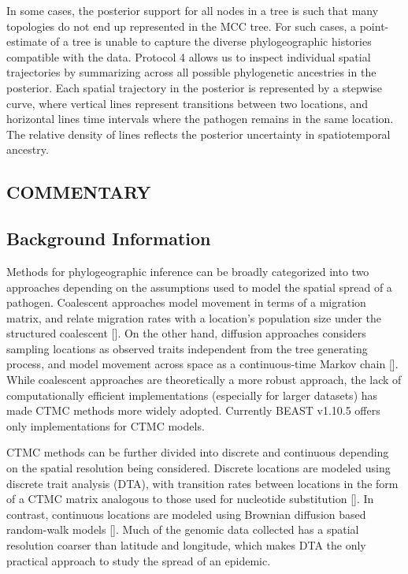 \documentclass{article}
\begin{document}
In some cases, the posterior support for all nodes in a tree is such that many topologies do not end up represented in the MCC tree. For such cases, a point-estimate of a tree is unable to capture the diverse phylogeographic histories compatible with the data. Protocol 4 allows us to inspect individual spatial trajectories by summarizing across all possible phylogenetic ancestries in the posterior. Each spatial trajectory in the posterior is represented by a stepwise curve, where vertical lines represent transitions between two locations, and horizontal lines time intervals where the pathogen remains in the same location. The relative density of lines reflects the posterior uncertainty in spatiotemporal ancestry. 

\begin{multicols}{2}

\section*{COMMENTARY}
\subsection*{Background Information}

Methods for phylogeographic inference can be broadly categorized into two approaches depending on the assumptions used to model the spatial spread of a pathogen. Coalescent approaches model movement in terms of a migration matrix, and relate migration rates with a location's population size under the structured coalescent [\cite{basta,mascot}]. On the other hand, diffusion approaches considers sampling locations as observed traits independent from the tree generating process, and model movement across space as a continuous-time Markov chain [\cite{dta,rw}].  While coalescent approaches are theoretically a more robust approach, the lack of computationally efficient implementations (especially for larger datasets) has made CTMC methods more widely adopted. Currently BEAST v1.10.5 offers only implementations for CTMC models.

CTMC methods can be further divided into discrete and continuous depending on the spatial resolution being considered. Discrete locations are modeled using discrete trait analysis (DTA), with transition rates between locations in the form of a CTMC matrix analogous to those used for nucleotide substitution [\cite{dta}]. In contrast, continuous locations are modeled using Brownian diffusion based random-walk models [\cite{rw}]. Much of the genomic data collected has a spatial resolution coarser than latitude and longitude, which makes DTA the only practical approach to study the spread of an epidemic. 


\end{multicols}
\end{document}
